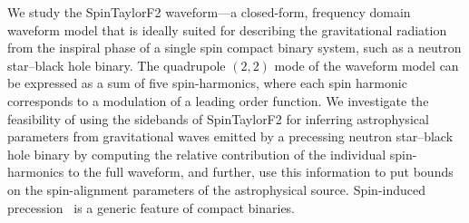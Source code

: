 \documentclass[12pt, a4wide]{report}
\begin{document}
We study the SpinTaylorF2 waveform---a closed-form, frequency domain waveform
model that is ideally suited for describing the gravitational radiation from
the inspiral phase of a single spin compact binary system, such as a neutron
star--black hole binary. The quadrupole $(2,2)$ mode of the waveform model can
be expressed as a sum of five spin-harmonics, where each spin harmonic
corresponds to a modulation of a leading order function. We investigate the
feasibility of using the sidebands of SpinTaylorF2 for inferring astrophysical
parameters from gravitational waves emitted by a precessing neutron 
star--black hole binary by computing the relative contribution of the individual
spin-harmonics to the full waveform, and further, use this information to put
bounds on the spin-alignment parameters of the astrophysical source.
Spin-induced precession~\cite{Apostolatos1994} is a generic feature of compact
binaries.  
\clearpage
\tableofcontents
\newpage
{}
\setcounter{page}{1}





% 
% 




\end{document}
